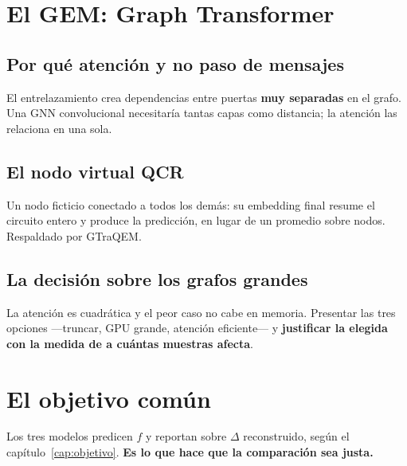 \section{El GEM: Graph Transformer}
\label{sec:gem}
\subsection{Por qué atención y no paso de mensajes}
El entrelazamiento crea dependencias entre puertas \textbf{muy separadas} en el grafo. Una GNN
convolucional necesitaría tantas capas como distancia; la atención las relaciona en una sola.

\subsection{El nodo virtual QCR}
Un nodo ficticio conectado a todos los demás: su embedding final resume el circuito entero y
produce la predicción, en lugar de un promedio sobre nodos. Respaldado por GTraQEM.

\subsection{La decisión sobre los grafos grandes}
La atención es cuadrática y el peor caso no cabe en memoria. Presentar las tres opciones
—truncar, GPU grande, atención eficiente— y \textbf{justificar la elegida con la medida de a
cuántas muestras afecta}.

\section{El objetivo común}
\label{sec:objetivo_comun}
Los tres modelos predicen $f$ y reportan sobre $\Delta$ reconstruido, según el
capítulo~\ref{cap:objetivo}. \textbf{Es lo que hace que la comparación sea justa.}
